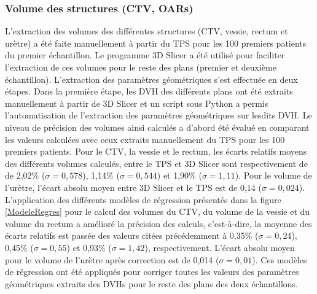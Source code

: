 \subsubsection{Volume des structures (CTV, OARs)}
L’extraction des volumes des différentes structures (CTV, vessie, rectum et urètre) a été faite manuellement à partir du TPS pour les 100 premiers patients du premier échantillon. Le programme 3D Slicer a été utilisé pour faciliter l’extraction de ces volumes pour le reste des plans (premier et deuxième échantillon). L’extraction des paramètres géométriques s’est effectuée en deux étapes. Dans la première étape, les DVH des différents plans ont été extraits manuellement à partir de 3D Slicer et un script sous Python a permis l’automatisation de l’extraction des paramètres géométriques sur lesdits DVH. Le niveau de précision des volumes ainsi calculés a d’abord été évalué en comparant les valeurs calculées avec ceux extraits manuellement du TPS pour les 100 premiers patients. Pour le CTV, la vessie et le rectum, les écarts relatifs moyens des différents volumes calculés, entre le TPS et 3D Slicer sont respectivement de de 2,02\% ($\sigma = 0,578 $), 1,14\% ($\sigma = 0,544 $) et 1,90\% ($\sigma = 1,11 $). Pour le volume de l’urètre, l’écart absolu moyen entre 3D Slicer et le TPS est de 0,14 ($\sigma = 0,024 $). L’application des différents modèles de régression présentés dans la figure \ref{ModeleRegres} pour le calcul des volumes du CTV, du volume de la vessie et du volume du rectum a amélioré la précision des calculs, c’est-à-dire, la moyenne des écarts relatifs est passée des valeurs citées précédemment à 0,35\% ($\sigma = 0,24 $), 0,45\% ($\sigma = 0,55 $) et 0,93\% ($\sigma = 1,42 $), respectivement. L’écart absolu moyen pour le volume de l’urètre après correction est de 0,014 ($\sigma = 0,01 $). Ces modèles de régression ont été appliqués pour corriger toutes les valeurs des paramètres géométriques extraits des DVHs pour le reste des plans des deux échantillons.
%
